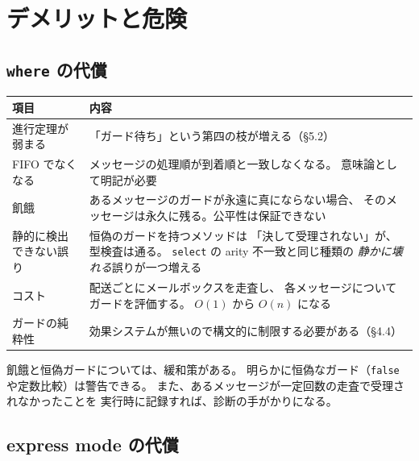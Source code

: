 \documentclass[11pt,a4paper]{ltjsarticle}
\theoremstyle{remark}
\begin{document}
\section{デメリットと危険}

\subsection{\texttt{where} の代償}

\begin{center}
\small
\begin{tabular}{@{}lp{8.8cm}@{}}
\toprule
項目 & 内容 \\
\midrule
進行定理が弱まる & 「ガード待ち」という第四の枝が増える（\S 5.2） \\
FIFO でなくなる & メッセージの処理順が到着順と一致しなくなる。
  意味論として明記が必要 \\
飢餓 & あるメッセージのガードが永遠に真にならない場合、
  そのメッセージは永久に残る。公平性は保証できない \\
静的に検出できない誤り & 恒偽のガードを持つメソッドは
  「決して受理されない」が、型検査は通る。
  \texttt{select} の arity 不一致と同じ種類の
  \emph{静かに壊れる}誤りが一つ増える \\
コスト & 配送ごとにメールボックスを走査し、
  各メッセージについてガードを評価する。
  $O(1)$ から $O(n)$ になる \\
ガードの純粋性 & 効果システムが無いので構文的に制限する必要がある（\S 4.4）\\
\bottomrule
\end{tabular}
\end{center}

飢餓と恒偽ガードについては、緩和策がある。
明らかに恒偽なガード（\texttt{false} や定数比較）は警告できる。
また、あるメッセージが一定回数の走査で受理されなかったことを
実行時に記録すれば、診断の手がかりになる。

\subsection{express mode の代償}
\end{document}
